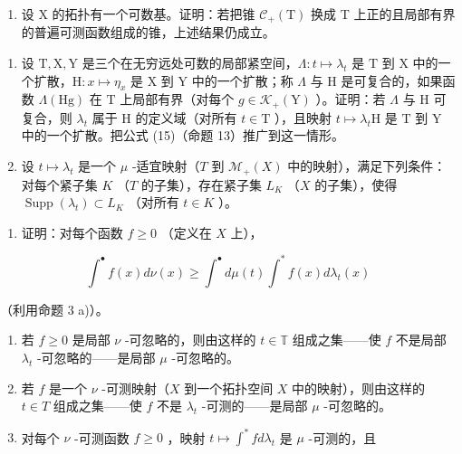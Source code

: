 \begin{enumerate}
\def\labelenumi{\alph{enumi})}
\setcounter{enumi}{1}
\tightlist
\item
  设 X 的拓扑有一个可数基。证明：若把锥 \(\mathcal{C}_{+}(\mathrm{T})\) 换成 T 上正的且局部有界的普遍可测函数组成的锥，上述结果仍成立。
\end{enumerate}

\begin{enumerate}
\def\labelenumi{\arabic{enumi})}
\setcounter{enumi}{9}
\item
  设 \(\mathrm{T}, \mathrm{X}, \mathrm{Y}\) 是三个在无穷远处可数的局部紧空间，\(\Lambda : t \mapsto \lambda_t\) 是 \(\mathrm{T}\) 到 \(\mathrm{X}\) 中的一个扩散，\(\mathrm{H}: x \mapsto \eta_x\) 是 \(\mathrm{X}\) 到 \(\mathrm{Y}\) 中的一个扩散；称 \(\Lambda\) 与 \(\mathrm{H}\) 是可复合的，如果函数 \(\Lambda(\mathrm{Hg})\) 在 \(\mathrm{T}\) 上局部有界（对每个 \(g \in \mathcal{K}_+(\mathrm{Y})\) ）。证明：若 \(\Lambda\) 与 \(\mathrm{H}\) 可复合，则 \(\lambda_t\) 属于 \(\mathrm{H}\) 的定义域（对所有 \(t \in \mathrm{T}\) ），且映射 \(t \mapsto \lambda_t\mathrm{H}\) 是 \(\mathrm{T}\) 到 \(\mathrm{Y}\) 中的一个扩散。把公式 (15)（命题 13）推广到这一情形。
\item
  设 \(t \mapsto \lambda_t\) 是一个 \(\mu\) -适宜映射（\(T\) 到 \(\mathcal{M}_+(X)\) 中的映射），满足下列条件：对每个紧子集 \(K\) （\(T\) 的子集），存在紧子集 \(L_K\) （\(X\) 的子集），使得 \(\operatorname{Supp}(\lambda_t) \subset L_K\) （对所有 \(t \in K\) ）。
\end{enumerate}

\begin{enumerate}
\def\labelenumi{\alph{enumi})}
\tightlist
\item
  证明：对每个函数 \(f \geqslant 0\) （定义在 \(X\) 上），
\end{enumerate}

\[
\int^ {\bullet} f (x) d \nu (x) \geqslant \int^ {\bullet} d \mu (t) \int^ {*} f (x) d \lambda_ {t} (x)
\]

（利用命题 3 a)）。

\begin{enumerate}
\def\labelenumi{\alph{enumi})}
\setcounter{enumi}{1}
\item
  若 \(f \geqslant 0\) 是局部 \(\nu\) -可忽略的，则由这样的 \(t \in \mathbb{T}\) 组成之集——使 \(f\) 不是局部 \(\lambda_t\) -可忽略的——是局部 \(\mu\) -可忽略的。
\item
  若 \(f\) 是一个 \(\nu\) -可测映射（\(X\) 到一个拓扑空间 \(X\) 中的映射），则由这样的 \(t \in T\) 组成之集——使 \(f\) 不是 \(\lambda_t\) -可测的——是局部 \(\mu\) -可忽略的。
\item
  对每个 \(\nu\) -可测函数 \(f \geqslant 0\) ，映射 \(t \mapsto \int^{*} f d\lambda_{t}\) 是 \(\mu\) -可测的，且
\end{enumerate}

